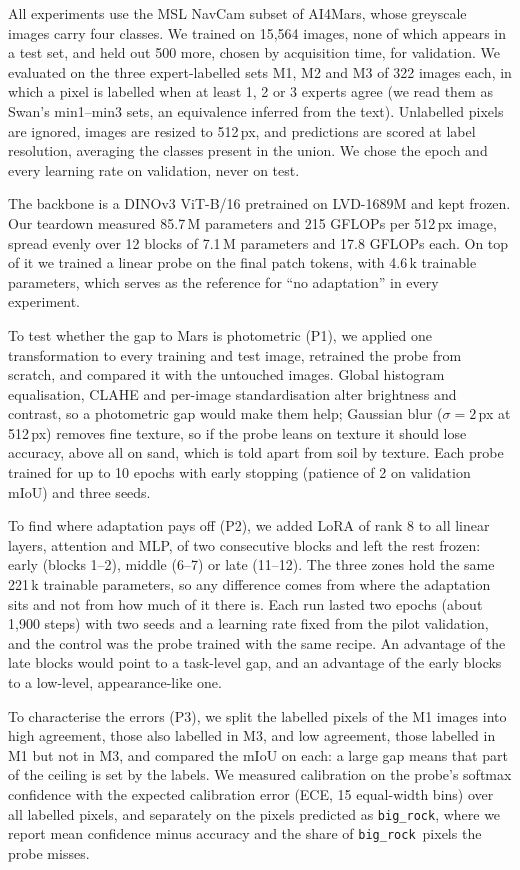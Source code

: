 \documentclass[conference]{IEEEtran}
\newcommand{\bigrock}{\texttt{big\_rock}}
\begin{document}
All experiments use the MSL NavCam subset of AI4Mars, whose greyscale images carry four classes. We trained on 15{,}564 images, none of which appears in a test set, and held out 500 more, chosen by acquisition time, for validation. We evaluated on the three expert-labelled sets M1, M2 and M3 of 322 images each, in which a pixel is labelled when at least 1, 2 or 3 experts agree (we read them as Swan's min1--min3 sets, an equivalence inferred from the text). Unlabelled pixels are ignored, images are resized to 512\,px, and predictions are scored at label resolution, averaging the classes present in the union. We chose the epoch and every learning rate on validation, never on test.

The backbone is a DINOv3 ViT-B/16 pretrained on LVD-1689M and kept frozen. Our teardown measured 85.7\,M parameters and 215 GFLOPs per 512\,px image, spread evenly over 12 blocks of 7.1\,M parameters and 17.8 GFLOPs each. On top of it we trained a linear probe on the final patch tokens, with 4.6\,k trainable parameters, which serves as the reference for ``no adaptation'' in every experiment.

To test whether the gap to Mars is photometric (P1), we applied one transformation to every training and test image, retrained the probe from scratch, and compared it with the untouched images. Global histogram equalisation, CLAHE and per-image standardisation alter brightness and contrast, so a photometric gap would make them help; Gaussian blur ($\sigma{=}2$\,px at 512\,px) removes fine texture, so if the probe leans on texture it should lose accuracy, above all on sand, which is told apart from soil by texture. Each probe trained for up to 10 epochs with early stopping (patience of 2 on validation mIoU) and three seeds.

To find where adaptation pays off (P2), we added LoRA \cite{hu2022lora} of rank 8 to all linear layers, attention and MLP, of two consecutive blocks and left the rest frozen: early (blocks 1--2), middle (6--7) or late (11--12). The three zones hold the same 221\,k trainable parameters, so any difference comes from where the adaptation sits and not from how much of it there is. Each run lasted two epochs (about 1{,}900 steps) with two seeds and a learning rate fixed from the pilot validation, and the control was the probe trained with the same recipe. An advantage of the late blocks would point to a task-level gap, and an advantage of the early blocks to a low-level, appearance-like one.

To characterise the errors (P3), we split the labelled pixels of the M1 images into high agreement, those also labelled in M3, and low agreement, those labelled in M1 but not in M3, and compared the mIoU on each: a large gap means that part of the ceiling is set by the labels. We measured calibration on the probe's softmax confidence with the expected calibration error \cite{guo2017calibration} (ECE, 15 equal-width bins) over all labelled pixels, and separately on the pixels predicted as \bigrock, where we report mean confidence minus accuracy and the share of \bigrock\ pixels the probe misses.
\end{document}
